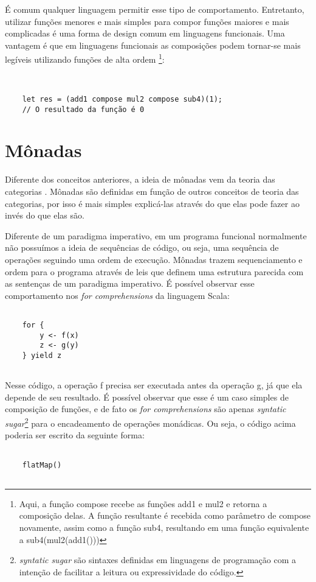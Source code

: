 É comum qualquer linguagem permitir esse tipo 
de comportamento. Entretanto, 
utilizar funções menores e mais simples para compor 
funções maiores e mais complicadas é uma forma de 
design comum em linguagens funcionais. Uma vantagem é 
que em linguagens funcionais as composições podem 
tornar-se mais legíveis utilizando funções 
de alta ordem \footnote{Aqui, a função compose 
recebe as funções add1 e mul2 e retorna a 
composição delas. A função resultante 
é recebida como parâmetro de compose novamente, 
assim como a função sub4, resultando em uma função 
equivalente a sub4(mul2(add1()))}:

\begin{lstlisting}[caption={Exemplo de Composição de Funções},label=fogex]


    let res = (add1 compose mul2 compose sub4)(1);
    // O resultado da função é 0

\end{lstlisting}



\section{Mônadas}

Diferente dos conceitos anteriores, a ideia de 
mônadas 
vem da teoria das categorias \cite{functionalscala}. 
Mônadas são definidas em função de outros conceitos de 
teoria das categorias, por isso é mais simples explicá-las 
através do que elas pode fazer ao invés do que elas são. 

Diferente de um paradigma imperativo, em um programa 
funcional normalmente não possuímos a ideia de 
sequências de código, ou seja, uma sequência de 
operações seguindo uma ordem de execução. Mônadas 
trazem sequenciamento e ordem para o programa através 
de leis que definem uma estrutura parecida com as 
sentenças de um paradigma imperativo\cite{camargomonads}.
É possível observar esse comportamento nos \textit{for 
comprehensions} da linguagem Scala\cite{functionalscala}:

\begin{lstlisting}[caption={Exemplo de notação for},label=foropscala]

    for {
        y <- f(x)
        z <- g(y)
    } yield z
    

\end{lstlisting}

Nesse código, a operação f precisa ser executada 
antes da operação g, já que ela depende de seu 
resultado. É possível observar que esse é um caso 
simples de composição de funções, e de fato os 
\textit{for comprehensions} são apenas \textit{syntatic 
sugar}\footnote{\textit{syntatic sugar} são sintaxes 
definidas em linguagens de programação com a intenção 
de facilitar a leitura ou expressividade do código.} 
para o encadeamento de operações monádicas\cite{yieldscala}. 
Ou seja, o código acima poderia ser escrito 
da seguinte forma:

\begin{lstlisting}[caption={Exemplo de fmap},label=fmapscala]

    flatMap()
    

\end{lstlisting}